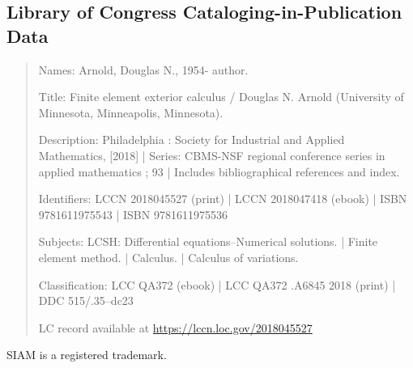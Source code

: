 \subsection*{{Library of Congress Cataloging-in-Publication Data}}
\begin{quote}\small
Names: Arnold, Douglas N., 1954- author.\par
Title: Finite element exterior calculus / Douglas N. Arnold (University of Minnesota, Minneapolis, Minnesota).\par
Description: Philadelphia : Society for Industrial and Applied Mathematics, [2018] | Series: CBMS-NSF regional conference series in applied mathematics ; 93 | Includes bibliographical references and index.\par
Identifiers: LCCN 2018045527 (print) | LCCN 2018047418 (ebook) | ISBN 9781611975543 | ISBN 9781611975536\par
Subjects: LCSH: Differential equations--Numerical solutions. | Finite element method. | Calculus. | Calculus of variations.\par
Classification: LCC QA372 (ebook) | LCC QA372 .A6845 2018 (print) | DDC 515/.35--dc23\par
LC record available at \url{https://lccn.loc.gov/2018045527}
\end{quote}

{SIAM is a registered trademark.}
\clearpage
